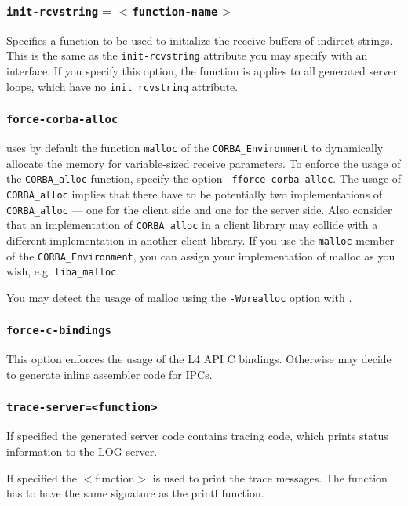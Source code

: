 \subsubsection{{\tt init-rcvstring$=<$function-name$>$}}
Specifies a function to be used to initialize the receive buffers of indirect
strings. This is the same as the \verb|init-rcvstring| attribute you may specify
with an interface. If you specify this option, the function is applies to all 
generated server loops, which have no \verb|init_rcvstring| attribute.

\subsubsection{{\tt force-corba-alloc}}
\label{sec:force-corba-alloc}

\dice{} uses by default the function \verb|malloc| of
the \verb|CORBA_Environment| to dynamically allocate 
the memory for variable-sized receive parameters. To enforce
the usage of the \verb|CORBA_alloc|
function, specify the option {\tt -fforce-corba-alloc}. The usage of
\verb|CORBA_alloc| implies that there
have to be potentially two implementations of \verb|CORBA_alloc| --- one
for the client side and one for the server side. Also consider that
an implementation of \verb|CORBA_alloc| in a client library may collide with
a different implementation in another client library.
If you use the \verb|malloc| member of the \verb|CORBA_Environment|,
you can assign your implementation of malloc as you wish, e.g.
\verb|liba_malloc|.

You may detect the usage of malloc using the
\verb|-Wprealloc| option with \dice{}.


\subsubsection{{\tt force-c-bindings}}
This option enforces the usage of the L4 API C bindings. Otherwise \dice{}
may decide to generate inline assembler code for IPCs.

\subsubsection{{\tt trace-server=<function>}}
If specified the generated server code contains tracing code, which prints
status information to the LOG server.

If specified the $<$function$>$ is used to print the trace messages. The function
has to have the same signature as the printf function.


